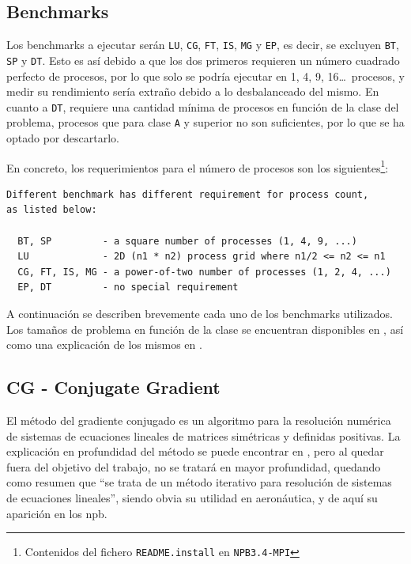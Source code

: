 \subsection{Benchmarks}
\label{ssec:benchmarks}

Los benchmarks a ejecutar serán \texttt{LU}, \texttt{CG}, \texttt{FT}, \texttt{IS}, \texttt{MG} y \texttt{EP}, es decir, se excluyen \texttt{BT}, \texttt{SP} y \texttt{DT}. Esto es así debido a que los dos primeros requieren un número cuadrado perfecto de procesos, por lo que solo se podría ejecutar en 1, 4, 9, 16\dots\ procesos, y medir su rendimiento sería extraño debido a lo desbalanceado del mismo. En cuanto a \texttt{DT}, requiere una cantidad mínima de procesos en función de la clase del problema, procesos que para clase \texttt{A} y superior no son suficientes, por lo que se ha optado por descartarlo.

En concreto, los requerimientos para el número de procesos son los siguientes\footnote{Contenidos del fichero \texttt{README.install} en \texttt{NPB3.4-MPI}}:

\begin{lstlisting}
Different benchmark has different requirement for process count,
as listed below:

  BT, SP         - a square number of processes (1, 4, 9, ...)
  LU             - 2D (n1 * n2) process grid where n1/2 <= n2 <= n1
  CG, FT, IS, MG - a power-of-two number of processes (1, 2, 4, ...)
  EP, DT         - no special requirement
\end{lstlisting}

A continuación se describen brevemente cada uno de los benchmarks utilizados. Los tamaños de problema en función de la clase se encuentran disponibles en \cite{npb_problem_sizes}, así como una explicación de los mismos en \cite{benchmarks1994technical}. 

\subsection{CG - Conjugate Gradient}
\label{sssec:benchmarks__cg}
El método del gradiente conjugado es un algoritmo para la resolución numérica de sistemas de ecuaciones lineales de matrices simétricas y definidas positivas. La explicación en profundidad del método se puede encontrar en \cite[2.2.3]{hestenes1952methods}, pero al quedar fuera del objetivo del trabajo, no se tratará en mayor profundidad, quedando como resumen que ``se trata de un método iterativo para resolución de sistemas de ecuaciones lineales'', siendo obvia su utilidad en aeronáutica, y de aquí su aparición en los \acrlong{npb}.

